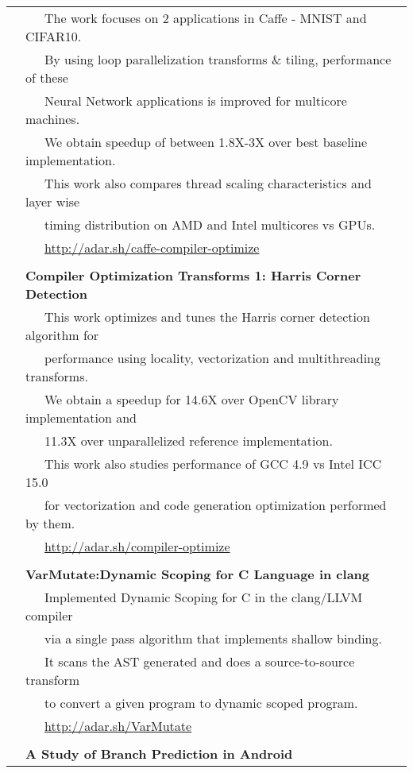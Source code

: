 \documentclass[a4paper,10pt]{article} %
\begin{document}
\begin{tabular}{rl}
& ~~~The work focuses on 2 applications in Caffe - MNIST and CIFAR10. \\
& ~~~By using loop parallelization transforms \& tiling, performance of these \\
& ~~~Neural Network applications is improved for multicore machines. \\
& ~~~We obtain speedup of between 1.8X-3X over best baseline implementation.\\
& ~~~This work also compares thread scaling characteristics and layer wise \\
& ~~~timing distribution on AMD and Intel multicores vs GPUs.\\
& ~~~\href{http://adar.sh/caffe-compiler-optimize}{http://adar.sh/caffe-compiler-optimize}\\
& \\
& \textbf{Compiler Optimization Transforms 1: Harris Corner Detection}\\
& ~~~This work optimizes and tunes the Harris corner detection algorithm for \\
& ~~~performance using locality, vectorization and multithreading transforms. \\
& ~~~We obtain a speedup for 14.6X over OpenCV library implementation and \\
& ~~~11.3X over unparallelized reference implementation.\\
& ~~~This work also studies performance of GCC 4.9 vs Intel ICC 15.0\\
& ~~~for vectorization and code generation optimization performed by them.\\
& ~~~\href{http://adar.sh/compiler-optimize}{http://adar.sh/compiler-optimize}\\
& \\
& \textbf{VarMutate:Dynamic Scoping for C Language in clang}\\
& ~~~Implemented Dynamic Scoping for C in the clang/LLVM compiler\\
& ~~~via a single pass algorithm that implements shallow binding.\\
& ~~~It scans the AST generated and does a source-to-source transform\\
& ~~~to convert a given program to dynamic scoped program.\\
& ~~~\href{http://adar.sh/VarMutate}{http://adar.sh/VarMutate} \\
& \\
& \textbf{A Study of Branch Prediction in Android} \\

\end{tabular}
\end{document}
